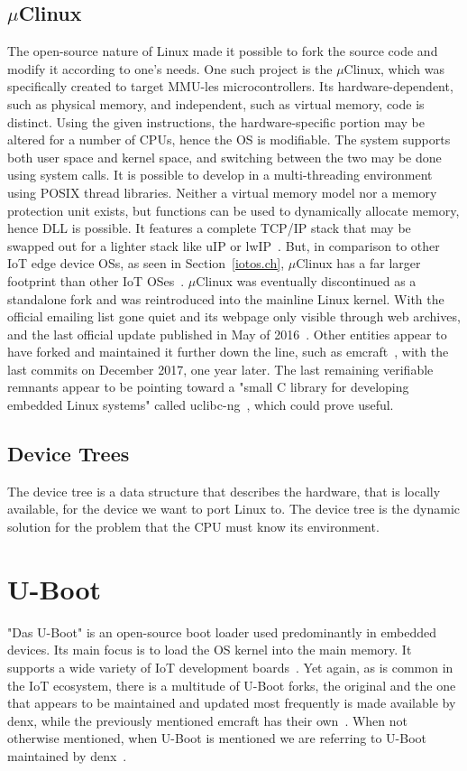 \subsection{$\mu$Clinux}\label{uclinux.ch}
The open-source nature of Linux made it possible to fork the source code and modify it according to one's needs. One such project is the $\mu$Clinux, which was specifically created to target MMU-les microcontrollers. Its hardware-dependent, such as physical memory, and independent, such as virtual memory, code is distinct. Using the given instructions, the hardware-specific portion may be altered for a number of CPUs, hence the OS is modifiable. The system supports both user space and kernel space, and switching between the two may be done using system calls. It is possible to develop in a multi-threading environment using POSIX thread libraries. Neither a virtual memory model nor a memory protection unit exists, but functions can be used to dynamically allocate memory, hence DLL is possible. It features a complete TCP/IP stack that may be swapped out for a lighter stack like uIP or lwIP~\cite{dunkels2003full}. But, in comparison to other IoT edge device OSs, as seen in Section~\ref{iotos.ch}, $\mu$Clinux has a far larger footprint than other IoT OSes~\cite{gaur2015operating}. $\mu$Clinux was eventually discontinued as a standalone fork and was reintroduced into the mainline Linux kernel. With the official emailing list gone quiet and its webpage only visible through web archives, and the last official update published in May of 2016~\cite{uclinux.org}. Other entities appear to have forked and maintained it further down the line, such as emcraft~\cite{emcraft, emuClinux}, with the last commits on December 2017, one year later. The last remaining verifiable remnants appear to be pointing toward a "small C library for developing embedded Linux systems" called uclibc-ng~\cite{uclibc-ng}, which could prove useful.

\subsection{Device Trees}
The device tree is a data structure that describes the hardware, that is locally available, for the device we want to port Linux to. The device tree is the dynamic solution for the problem that the CPU must know its environment. 

\section{U-Boot}
"Das U-Boot" is an open-source boot loader used predominantly in embedded devices. Its main focus is to load the OS kernel into the main memory. It supports a wide variety of IoT development boards~\cite{u-boot-doc}. Yet again, as is common in the IoT ecosystem, there is a multitude of U-Boot forks, the original and the one that appears to be maintained and updated most frequently is made available by denx, while the previously mentioned emcraft has their own~\cite{emUboot}. When not otherwise mentioned, when U-Boot is mentioned we are referring to U-Boot maintained by denx~\cite{u-boot}.

